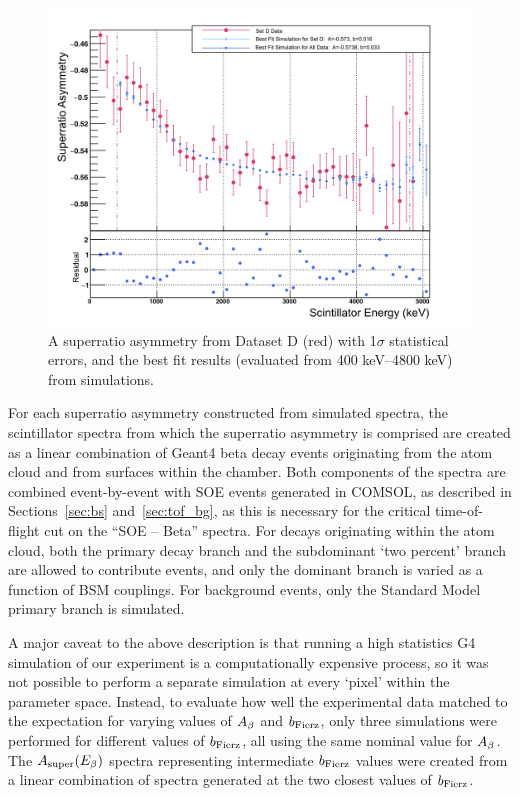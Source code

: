 %	
\begin{figure}[h!t!b!]
	\centering
	\includegraphics[width=.999\linewidth]
	{Figures/BestAsymmetry_SetD.png}
	\caption[SetD Superratio Asymmetry]{A superratio asymmetry from Dataset D (red) with 1$\sigma$ statistical errors, and the best fit results (evaluated from 400 keV--4800 keV) from simulations.  %
	}	
	\label{fig:asymmetryD}
\end{figure}
%

For each superratio asymmetry constructed from simulated spectra, the scintillator spectra from which the superratio asymmetry is comprised are created as a linear combination of Geant4 beta decay events originating from the atom cloud and from surfaces within the chamber.  Both components of the spectra are combined event-by-event with SOE events generated in COMSOL, as described in Sections~\ref{sec:bs} and~\ref{sec:tof_bg}, as this is necessary for the critical time-of-flight cut on the ``SOE -- Beta'' spectra.  For decays originating within the atom cloud, both the primary decay branch and the subdominant `two percent' branch are allowed to contribute events, and only the dominant branch is varied as a function of BSM couplings.  For background events, only the Standard Model primary branch is simulated.  

A major caveat to the above description is that running a high statistics G4 simulation of our experiment is a computationally expensive process, so it was not possible to perform a separate simulation at every `pixel' within the parameter space.  Instead, to evaluate how well the experimental data matched to the expectation for varying values of $A_{\beta}$ and $b_{\mathrm{Fierz}}$, only three simulations were performed for different values of $b_{\mathrm{Fierz}}$, all using the same nominal value for $A_{\beta}$.  The $A_{\mathrm{super}}(E_{\beta})$ spectra representing intermediate $b_{\mathrm{Fierz}}$ values were created from a linear combination of spectra generated at the two closest values of $b_{\mathrm{Fierz}}$.

